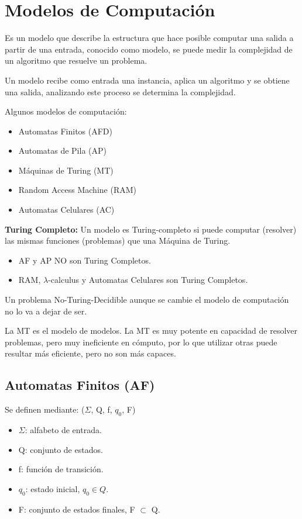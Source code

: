 \chapter{Modelos de Computación}\label{ch:modelos-de-computación}
Es un modelo que describe la estructura que hace posible computar una salida a partir de una entrada, conocido como modelo, se puede medir la complejidad de un algoritmo que resuelve un problema.

Un modelo recibe como entrada una instancia, aplica un algoritmo y se obtiene una salida, analizando este proceso se determina la complejidad.

Algunos modelos de computación:
\begin{itemize}
    \item Automatas Finitos (AFD)
    \item Automatas de Pila (AP)
    \item Máquinas de Turing (MT)
    \item Random Access Machine (RAM)
    \item Automatas Celulares (AC)
\end{itemize}

\textbf{Turing Completo:} Un modelo es Turing-completo si puede computar (resolver) las mismas funciones (problemas) que una Máquina de Turing.
\begin{itemize}
    \item AF y AP NO son Turing Completos.
    \item RAM, $\lambda$-calculus y Automatas Celulares son Turing Completos.
\end{itemize}

Un problema No-Turing-Decidible aunque se cambie el modelo de computación no lo va a dejar de ser.

La MT es el modelo de modelos. La MT es muy potente en capacidad de resolver problemas, pero muy ineficiente en cómputo, por lo que utilizar otras puede resultar más eficiente, pero no son más capaces.

\section{Automatas Finitos (AF)}
Se definen mediante: ($\Sigma$, Q, f, $q_0$, F)
\begin{itemize}
    \item $\Sigma$: alfabeto de entrada.
    \item Q: conjunto de estados.
    \item f: función de transición.
    \item $q_0$: estado inicial, $q_0 \in Q$.
    \item F: conjunto de estados finales, F $\subset$ Q.
\end{itemize}


